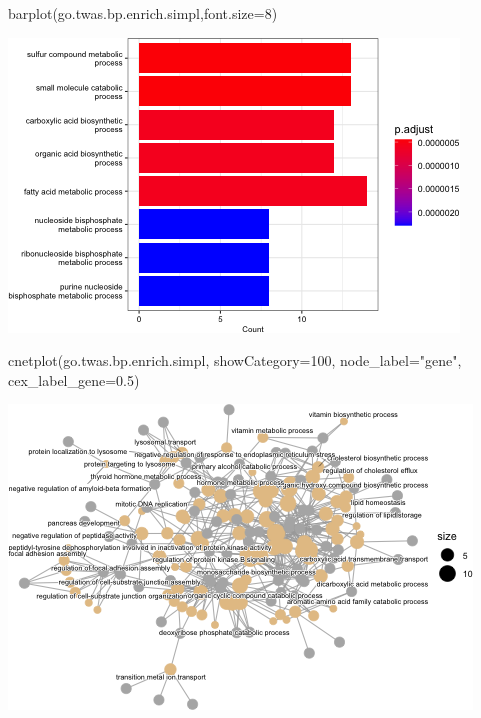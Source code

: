 \documentclass[
]{article}
\newenvironment{Shaded}{\begin{snugshade}}{\end{snugshade}}
\newcommand{\AttributeTok}[1]{\textcolor[rgb]{0.77,0.63,0.00}{#1}}
\newcommand{\DecValTok}[1]{\textcolor[rgb]{0.00,0.00,0.81}{#1}}
\newcommand{\FloatTok}[1]{\textcolor[rgb]{0.00,0.00,0.81}{#1}}
\newcommand{\FunctionTok}[1]{\textcolor[rgb]{0.00,0.00,0.00}{#1}}
\newcommand{\NormalTok}[1]{#1}
\newcommand{\StringTok}[1]{\textcolor[rgb]{0.31,0.60,0.02}{#1}}
\begin{document}
\begin{Shaded}
\begin{Highlighting}[]
\FunctionTok{barplot}\NormalTok{(go.twas.bp.enrich.simpl,}\AttributeTok{font.size=}\DecValTok{8}\NormalTok{)}
\end{Highlighting}
\end{Shaded}

\includegraphics{figures/twas-go-ncd-2.png}

\begin{Shaded}
\begin{Highlighting}[]
\FunctionTok{cnetplot}\NormalTok{(go.twas.bp.enrich.simpl, }
         \AttributeTok{showCategory=}\DecValTok{100}\NormalTok{,}
         \AttributeTok{node\_label=}\StringTok{"gene"}\NormalTok{,}
         \AttributeTok{cex\_label\_gene=}\FloatTok{0.5}\NormalTok{)}
\end{Highlighting}
\end{Shaded}

\includegraphics{figures/twas-go-ncd-3.png}
\end{document}
